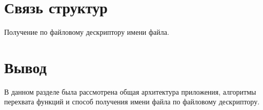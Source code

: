 \section{Связь структур}
    Получение по файловому дескриптору имени файла.

\section{Вывод}
    В данном разделе была рассмотрена общая архитектура приложения, 
    алгоритмы перехвата функций и 
    способ получения имени файла по файловому дескриптору.

\pagebreak